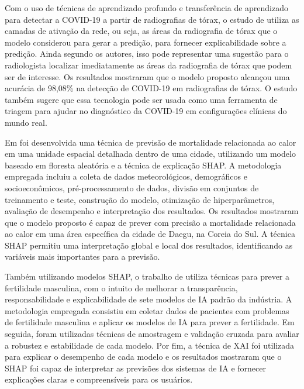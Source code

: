 Com o uso de técnicas de aprendizado profundo e transferência de aprendizado para detectar a COVID-19 a partir de radiografias de tórax, o estudo de  utiliza as camadas de ativação da rede, ou seja, as áreas da radiografia de tórax que o modelo considerou para gerar a predição, para fornecer explicabilidade sobre a predição. Ainda segundo os autores, isso pode representar uma sugestão para o radiologista localizar imediatamente as áreas da radiografia de tórax que podem ser de interesse. Os resultados mostraram que o modelo proposto alcançou uma acurácia de 98,08\% na detecção de COVID-19 em radiografias de tórax. O estudo também sugere que essa tecnologia pode ser usada como uma ferramenta de triagem para ajudar no diagnóstico da COVID-19 em configurações clínicas do mundo real.

Em \cite{KIM2022103677} foi desenvolvida uma técnica de previsão de mortalidade relacionada ao calor em uma unidade espacial detalhada dentro de uma cidade, utilizando um modelo baseado em floresta aleatória e a técnica de explicação SHAP. A metodologia empregada incluiu a coleta de dados meteorológicos, demográficos e socioeconômicos, pré-processamento de dados, divisão em conjuntos de treinamento e teste, construção do modelo, otimização de hiperparâmetros, avaliação de desempenho e interpretação dos resultados. Os resultados mostraram que o modelo proposto é capaz de prever com precisão a mortalidade relacionada ao calor em uma área específica da cidade de Daegu, na Coreia do Sul. A técnica SHAP permitiu uma interpretação global e local dos resultados, identificando as variáveis mais importantes para a previsão.

Também utilizando modelos SHAP, o trabalho de  utiliza técnicas para prever a fertilidade masculina, com o intuito de melhorar a transparência, responsabilidade e explicabilidade de sete modelos de IA padrão da indústria. A metodologia empregada consistiu em coletar dados de pacientes com problemas de fertilidade masculina e aplicar os modelos de IA para prever a fertilidade. Em seguida, foram utilizadas técnicas de amostragem e validação cruzada para avaliar a robustez e estabilidade de cada modelo. Por fim, a técnica de XAI foi utilizada para explicar o desempenho de cada modelo e os resultados mostraram que o SHAP foi capaz de interpretar as previsões dos sistemas de IA e fornecer explicações claras e compreensíveis para os usuários.